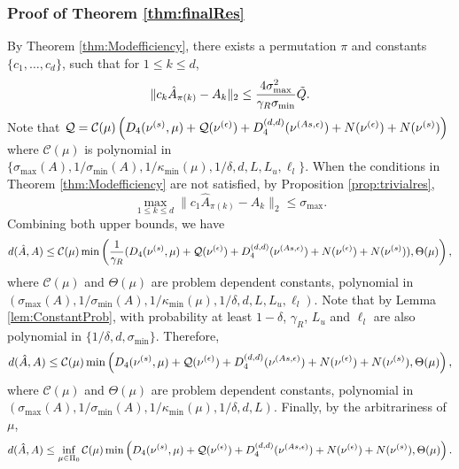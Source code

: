 \subsubsection{Proof of Theorem \ref{thm:finalRes}}
By Theorem \ref{thm:Modefficiency}, there exists a permutation $\pi$ and constants $\{c_1,\ldots,c_d\}$, such that for $1\le k\le d$,
\[
\| c_k\hat{A}_{\pi(k)} - A_k\|_2 \le \frac{4\sigma^2_{\max}}{\gamma_R\sigma_{\min}} \tilde{Q}.
\]
Note that $\mathcal{Q} = \mathcal{C}(\mu)\left(D_4(\nu^{(s)},\mu)+ \mathcal{Q}(\nu^{(\epsilon)}) + D_4^{(d,d)}(\nu^{(As,\epsilon)})
+N(\nu^{(\epsilon)}) + N( \nu^{(s)})\right)$ where $\mathcal{C}(\mu)$ is polynomial in $\{\sigma_{\max}(A), 1/\sigma_{\min}(A), 1/\kappa_{\min}(\mu),1/\delta, d, L, L_u, \ell_l\}$.
When the conditions in Theorem \ref{thm:Modefficiency} are not satisfied, by Proposition \ref{prop:trivialres}, 
\[
  \max_{1\le k\le d}\| c_1\widehat{A}_{\pi(k)} - A_k\|_2 \le\sigma_{\max}.
\]
Combining both upper bounds, we have 
\[
 d(\hat{A}, A) \le \mathcal{C}(\mu)\min\left(\frac{1}{\gamma_R}(D_4(\nu^{(s)},\mu)+ \mathcal{Q}(\nu^{(\epsilon)}) + D_4^{(d,d)}(\nu^{(As,\epsilon)})
+N(\nu^{(\epsilon)}) + N( \nu^{(s)})), \Theta(\mu) \right),
\]
where $\mathcal{C}(\mu)$ and $\Theta(\mu)$ are problem dependent constants, polynomial in $(\sigma_{\max}(A), 1/\sigma_{\min}(A), 1/\kappa_{\min}(\mu),1/\delta, d, L, L_u, \ell_l)$.
Note that by Lemma \ref{lem:ConstantProb}, with probability at least $1-\delta$, $\gamma_R$, $L_u$ and $\ell_l$ are also polynomial in $\{1/\delta, d, \sigma_{\min}\}$. 
Therefore, 
\[
 d(\hat{A}, A) \le \mathcal{C}(\mu)\min\left(D_4(\nu^{(s)},\mu)+ \mathcal{Q}(\nu^{(\epsilon)}) + D_4^{(d,d)}(\nu^{(As,\epsilon)})
+N(\nu^{(\epsilon)}) + N( \nu^{(s)}), \Theta(\mu) \right),
\]
where $\mathcal{C}(\mu)$ and $\Theta(\mu)$ are problem dependent constants, polynomial in $(\sigma_{\max}(A), 1/\sigma_{\min}(A), 1/\kappa_{\min}(\mu),1/\delta, d, L)$.
Finally, by the arbitrariness of $\mu$,
\[
 d(\hat{A}, A) \le \inf_{\mu\in \Pi_0}\mathcal{C}(\mu)\min\left(D_4(\nu^{(s)},\mu)+ \mathcal{Q}(\nu^{(\epsilon)}) + D_4^{(d,d)}(\nu^{(As,\epsilon)})
+N(\nu^{(\epsilon)}) + N( \nu^{(s)}), \Theta(\mu) \right).
\]

